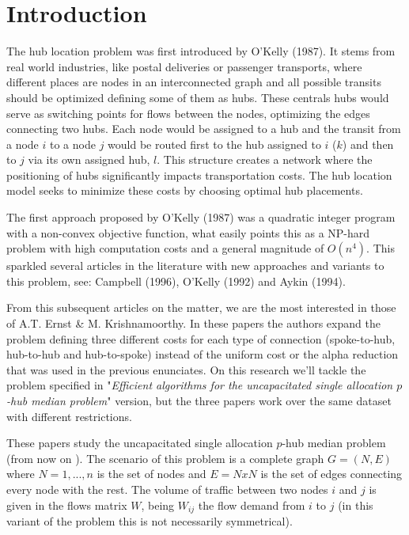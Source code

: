 \section{Introduction}

The hub location problem was first introduced by O'Kelly (1987)\cite{OKelly1987}. It stems from real world
industries, like postal deliveries or passenger transports, where different places are nodes in an
interconnected graph and all possible transits should be optimized defining some of them as hubs. These
centrals hubs would serve as switching points for flows between the nodes, optimizing the edges connecting
two hubs. Each node would be assigned to a hub and the transit from a node $i$ to a node $j$
would be routed first to the hub assigned to $i$ ($k$) and then to $j$ via its own assigned hub,
$l$. This structure creates a network where the positioning of hubs significantly impacts transportation
costs. The hub location model seeks to minimize these costs by choosing optimal hub placements.

The first approach proposed by O'Kelly (1987)\cite{OKelly1987} was a quadratic integer program with a
non-convex objective function, what easily points this as a NP-hard problem with high computation costs
and a general magnitude of $O(n^{4})$. This sparkled several articles in the literature
with new approaches and variants to this problem, see: Campbell (1996)\cite{Campbell1996}, O'Kelly (1992)
\cite{OKelly1992} and Aykin (1994)\cite{Aykin1994}.

From this subsequent articles on the matter, we are the most interested in those of A.T. Ernst \&
M. Krishnamoorthy\cite{Ernst1996}\cite{Ernst1998}\cite{Ernst1999}. In these papers the authors expand
the problem defining three different costs for each type of connection (spoke-to-hub, hub-to-hub and
hub-to-spoke) instead of the uniform cost or the alpha reduction that was used in the previous
enunciates. On this research we'll tackle the problem specified in "\emph{Efficient algorithms for
the uncapacitated single allocation $p$-hub median problem}"\cite{Ernst1996} version, but the three
papers work over the same dataset with different restrictions.

These papers study the uncapacitated single allocation $p$-hub median problem (from now on
). The scenario of this problem is a complete graph $G=(N,E)$ where $N={1, ..., n}$ is
the set of nodes and $E = N x N$ is the set of edges connecting every node with the rest.
The volume of traffic between two nodes $i$ and $j$ is given in the flows matrix $W$, being $W_{ij}$ 
the flow demand from $i$ to $j$ (in this variant of the problem this is not necessarily symmetrical).

